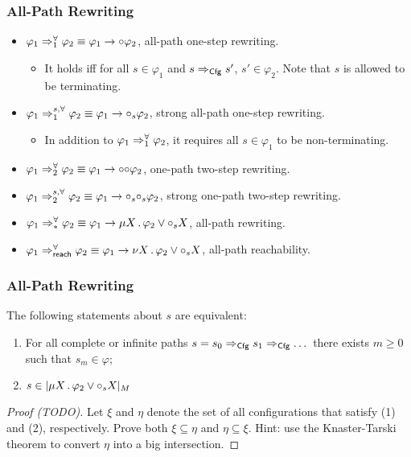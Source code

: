 \documentclass{beamer}
\begin{document}
\begin{frame}
\frametitle{All-Path Rewriting}
\begin{itemize}
\item $\varphi_1 \Rightarrow^{\forall}_{1} \varphi_2 \equiv 
       \varphi_1 \rightarrow \mathord{\circ} \varphi_2$,
all-path one-step rewriting.
\begin{itemize}
\item It holds iff for all $s \in \varphi_1$ and $s \Rightarrow_{\mathsf{Cfg}} s'$,
      $s' \in \varphi_2$.
      Note that $s$ is allowed to be terminating.
\end{itemize}
\item $\varphi_1 \Rightarrow^{s,\forall}_1 \varphi_2 \equiv 
       \varphi_1 \rightarrow \mathord{\circ}_s \varphi_2$,
strong all-path one-step rewriting.
\begin{itemize}
\item In addition to $\varphi_1 \Rightarrow^{\forall}_{1} \varphi_2$, it requires
      all $s \in \varphi_1$ to be non-terminating.
\end{itemize}
\item $\varphi_1 \Rightarrow^{\forall}_2 \varphi_2 \equiv 
       \varphi_1 \rightarrow \mathord{\circ}\mathord{\circ} \varphi_2$,
one-path two-step rewriting.
\item $\varphi_1 \Rightarrow^{s,\forall}_2 \varphi_2 \equiv 
       \varphi_1 \rightarrow \mathord{\circ}_s\mathord{\circ}_s \varphi_2$,
strong one-path two-step rewriting.
\item $\varphi_1 \Rightarrow^{\forall}_{*} \varphi_2 \equiv
       \varphi_1 \rightarrow \mu X \,.\, \varphi_2 \lor \mathord{\circ}_s X$, all-path
       rewriting.
\item $\varphi_1 \Rightarrow_\mathsf{reach}^\forall \varphi_2 \equiv
       \varphi_1 \rightarrow \nu X \,.\, \varphi_2 \lor \mathord{\circ}_s X$, all-path
       reachability.
\end{itemize}
\end{frame}

\begin{frame}
\frametitle{All-Path Rewriting}
\begin{lemma}
The following statements about $s$ are equivalent:
\begin{enumerate}
\item For all complete or infinite paths
      $s = s_0 \Rightarrow_{\mathsf{Cfg}} s_1 \Rightarrow_{\mathsf{Cfg}} \dots$
      there exists $m \ge 0$ such that $s_m \in \varphi$;
\item $s \in |\mu X \,.\, \varphi_2 \lor \mathord{\circ}_s X|_{M}$
\end{enumerate}
\end{lemma}
\begin{proof}[Proof (TODO)]
Let $\xi$ and $\eta$ denote the set of all configurations
that satisfy (1) and (2), respectively.
Prove both $\xi \subseteq \eta$ and $\eta \subseteq \xi$.
Hint: use the Knaster-Tarski theorem to convert
$\eta$ into a big intersection.
\end{proof}
\end{frame}
\end{document}
